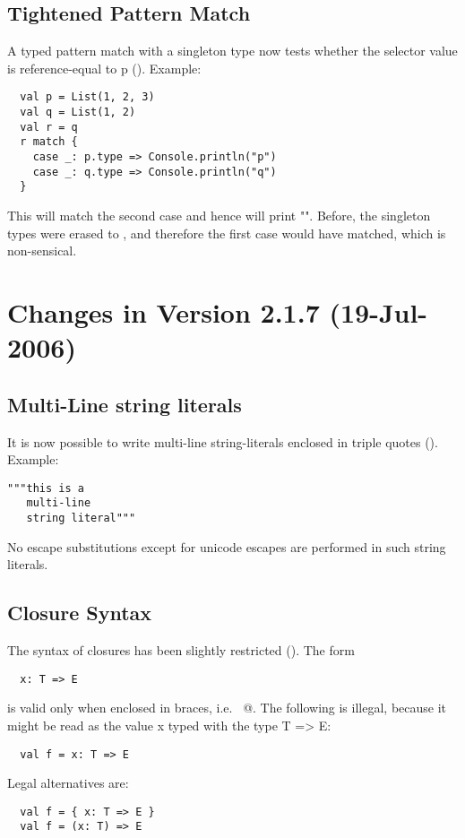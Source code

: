 \subsection*{Tightened Pattern Match}

A typed pattern match with a singleton type 
now tests whether the selector value is reference-equal to p
(). 
Example:
\begin{lstlisting}
  val p = List(1, 2, 3)
  val q = List(1, 2)
  val r = q
  r match {
    case _: p.type => Console.println("p")
    case _: q.type => Console.println("q")
  }
\end{lstlisting}
This will match the second case and hence will print "". 
Before, the singleton types were erased to , and therefore
the first case 
would have matched, which is non-sensical.

\section{Changes in Version 2.1.7 (19-Jul-2006)}

\subsection*{Multi-Line string literals} It is now possible to write
multi-line string-literals enclosed in triple quotes
(). 
Example:
\begin{lstlisting}
"""this is a
   multi-line
   string literal"""
\end{lstlisting}
No escape substitutions except for unicode escapes are performed in
such string literals.

\subsection*{Closure Syntax}

The syntax of closures has been slightly restricted (). The form
\begin{lstlisting}
  x: T => E
\end{lstlisting}
is valid only when enclosed in braces, i.e. ~@. 
The following is illegal, because it might be read as the value x typed with the type T => E:
\begin{lstlisting}
  val f = x: T => E
\end{lstlisting}
Legal alternatives are:
\begin{lstlisting}
  val f = { x: T => E }
  val f = (x: T) => E
\end{lstlisting}

